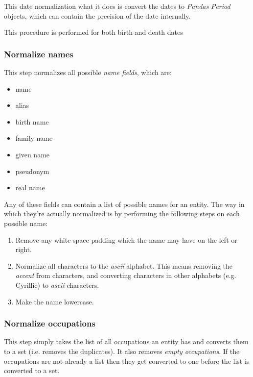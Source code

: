 \documentclass[epsfig,a4paper,11pt,titlepage,twoside,openany]{book}
\begin{document}
This date normalization what it does is convert the dates to \textit{Pandas} \cite{mckinney2010_pandas} \textit{Period} objects, which can contain the precision of the date internally. 

This procedure is performed for both birth and death dates 

\subsubsection{Normalize names}
\label{sec:data-preprocessiong-name-normalization}

This step normalizes all possible \textit{name fields}, which are: 

\begin{itemize}
    \item name
    \item alias
    \item birth name
    \item family name
    \item given name
    \item pseudonym
    \item real name
\end{itemize}

Any of these fields can contain a list of possible names for an entity. The way in which they're actually normalized is by performing the following steps on each possible name:

\begin{enumerate}
    \item Remove any white space padding which the name may have on the left or right.
    
    \item Normalize all characters to the \textit{ascii} alphabet. This means removing the \textit{accent} from characters, and converting characters in other alphabets (e.g. Cyrillic) to \textit{ascii} characters.

    \item Make the name lowercase.
\end{enumerate}

\subsubsection{Normalize occupations}
\label{sec:data-preprocessiong-occupations-normalization}

This step simply takes the list of all occupations an entity has and converts them to a set (i.e. removes the duplicates). It also removes \textit{empty occupations}. If the occupations are not already a list then they get converted to one before the list is converted to a set.
\end{document}
